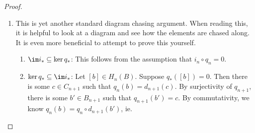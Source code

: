 \documentclass[a4paper]{article}
\begin{document}
\begin{proof}
\begin{enumerate}
\begin{enumerate}
\begin{align*}
            &= i_{n - 1} \circ d_n (a) + d_n(y).
          \end{align*}
          Hence when we pull back $d_n(y')$ and $d_n(y)$ to $A_{n - 1}$, the results differ by the boundary $d_n(a)$, and hence produce the same homology class.
        \item Suppose $[x'] = [x]$. We want to show that $\partial_* [x] = \partial_*[x']$. This time, we add a layer above.
          \[
            \begin{tikzcd}
              0 \ar[r] & A_{n + 1} \ar[r, "i_{n + 1}"] \ar[d, "d_{n + 1}"] & B_{n + 1} \ar[r, "q_{n + 1}"] \ar[d, "d_{n + 1}"] & C_{n + 1} \ar[r] \ar[d, "d_{n + 1}"] & 0\\
              0 \ar[r] & A_n \ar[r, "i_n"] \ar[d, "d_n"] & B_n \ar[r, "q_n"] \ar[d, "d_n"] & C_n \ar[r] \ar[d, "d_n"] & 0\\
              0 \ar[r] & A_{n - 1} \ar[r, "i_{n - 1}"] & B_{n - 1} \ar[r, "q_{n - 1}"] & C_{n - 1} \ar[r] & 0
            \end{tikzcd}
          \]
          By definition, since $[x'] = [x]$, there is some $c \in C_{n + 1}$ such that
          \[
            x' = x + d_{n + 1} (c).
          \]
          By surjectivity of $q_{n + 1}$, we can write $c = q_{n + 1}(b)$ for some $b \in B_{n + 1}$. By commutativity of the squares, we know
          \[
            x' = x + q_n \circ d_{n + 1} (b).
          \]
          The next step of the proof is to find some $y$ such that $q_n (y) = x$. Then
          \[
            q_n(y + d_{n + 1} (b)) = x'.
          \]
          So the corresponding $y'$ is $y' = y + d_{n + 1}(b)$. So $d_n (y) = d_n(y')$, and hence $\partial_*[x] = \partial_* [x']$.
      \end{enumerate}
    \item This is yet another standard diagram chasing argument. When reading this, it is helpful to look at a diagram and see how the elements are chased along. It is even more beneficial to attempt to prove this yourself.
      \begin{enumerate}
        \item $\im i_* \subseteq \ker q_*$: This follows from the assumption that $i_n \circ q_n = 0$.
        \item $\ker q_* \subseteq \im i_*$: Let $[b] \in H_n(B)$. Suppose $q_*([b]) = 0$. Then there is some $c \in C_{n + 1}$ such that $q_n(b) = d_{n + 1}(c)$. By surjectivity of $q_{n + 1}$, there is some $b' \in B_{n + 1}$ such that $q_{n + 1}(b') = c$. By commutativity, we know $q_n(b) = q_n \circ d_{n + 1}(b')$, ie.

\end{enumerate}
\end{enumerate}
\end{proof}
\end{document}
